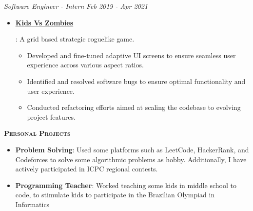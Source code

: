 \documentclass{article}
\newcommand{\resumeItem}[2]{
  \item{
    \textbf{#1}{: #2 \vspace{-5pt}}
  }
}
\newcommand{\simpleItem}[1]{
  \item{
    #1 \vspace{-3pt}
  }
}
\newcommand{\resumeSubSubheading}[2]{
    \noindent
    \vspace{5pt}
    \textit{#1} \dotfill \textit{ #2} \\
}
\newcommand{\resumeItemListStart}{\vspace{-8pt}\begin{itemize}}
\newcommand{\resumeItemListEnd}{\end{itemize}}
\newcommand{\resumeSubHeadingListStart}{\vspace{-10pt}\begin{itemize}}
\newcommand{\resumeSubHeadingListEnd}{\end{itemize}}
\newcommand{\resumeSubItemListStart}{\vspace{-5pt}\begin{itemize}}
\newcommand{\resumeSubItemListEnd}{\end{itemize}}
\newcommand{\resumeSection}[1]{
  \vspace{5pt}
    {\Large\textbf{\textsc{#1}}} \\
}
\begin{document}
    \resumeSubSubheading
    {Software Engineer - Intern}{Feb 2019 - Apr 2021}
      \resumeSubHeadingListStart
        \resumeItem
          {\href{https://www.youtube.com/watch?v=MLjikLDk6D8&ab_channel=LumenGames}{\color{blue}\underline{Kids Vs Zombies}}}
          {A grid based strategic roguelike game.
            \resumeSubItemListStart
              \simpleItem{Developed and fine-tuned adaptive UI screens to ensure seamless user experience across various aspect ratios.}
              \simpleItem{Identified and resolved software bugs to ensure optimal functionality and user experience.}
              \simpleItem{Conducted refactoring efforts aimed at scaling the codebase to evolving project features.}
            \resumeSubItemListEnd
          }
      \resumeSubHeadingListEnd


\resumeSection{Personal Projects}
  \resumeItemListStart
    \resumeItem{Problem Solving}
      {Used some platforms such as LeetCode, HackerRank, and Codeforces to solve some algorithmic problems as hobby. Additionally, I have actively participated in ICPC regional contests.}
    \resumeItem{Programming Teacher}
      {Worked teaching some kids in middle school to code, to stimulate kids to participate in the Brazilian Olympiad in Informatics}
  \resumeItemListEnd
\end{document}
